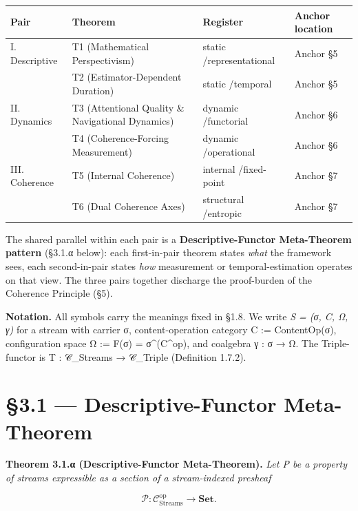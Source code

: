 \documentclass[11pt, openany]{book}
\newcommand{\sectionbreak}{\clearpage}
\begin{document}
\begingroup\setlength{\tabcolsep}{3pt}\renewcommand{\arraystretch}{1.15}\footnotesize
\begin{center}
\begin{tabular}{p{0.60in} p{2.01in} p{1.04in} p{0.63in}}
\toprule
Pair & Theorem & Register & Anchor location \\
\midrule
I. Descriptive & T1 (Mathematical Perspectivism) & static /\allowbreak  representational & Anchor §5 \\
 & T2 (Estimator-Dependent Duration) & static /\allowbreak  temporal & Anchor §5 \\
II. Dynamics & T3 (Attentional Quality \& Navigational Dynamics) & dynamic /\allowbreak  functorial & Anchor §6 \\
 & T4 (Coherence-Forcing Measurement) & dynamic /\allowbreak  operational & Anchor §6 \\
III. Coherence & T5 (Internal Coherence) & internal /\allowbreak  fixed-point & Anchor §7 \\
 & T6 (Dual Coherence Axes) & structural /\allowbreak  entropic & Anchor §7 \\
\bottomrule
\end{tabular}
\end{center}
\endgroup
The shared parallel within each pair is a \textbf{Descriptive-Functor Meta-Theorem pattern} (§3.1.α below): each first-in-pair theorem states \textit{what} the framework sees, each second-in-pair states \textit{how} measurement or temporal-estimation operates on that view. The three pairs together discharge the proof-burden of the Coherence Principle (§5).

\textbf{Notation.} All symbols carry the meanings fixed in §1.8. We write \textit{S = (σ, C, Ω, γ)} for a stream with carrier σ, content-operation category C := ContentOp(σ), configuration space Ω := F(σ) = σ\textasciicircum{}(C\textasciicircum{}op), and coalgebra γ : σ → Ω. The Triple-functor is T : 𝒞\_\allowbreak{}Streams → 𝒞\_\allowbreak{}Triple (Definition 1.7.2).

\sectionbreak

\section{§3.1 --- Descriptive-Functor Meta-Theorem}

\textbf{Theorem 3.1.α (Descriptive-Functor Meta-Theorem).} \textit{Let P be a property of streams expressible as a section of a stream-indexed presheaf}

\[
\mathcal{P} : \mathcal{C}_\mathrm{Streams}^\mathrm{op} \to \mathbf{Set}.
\]
\end{document}
